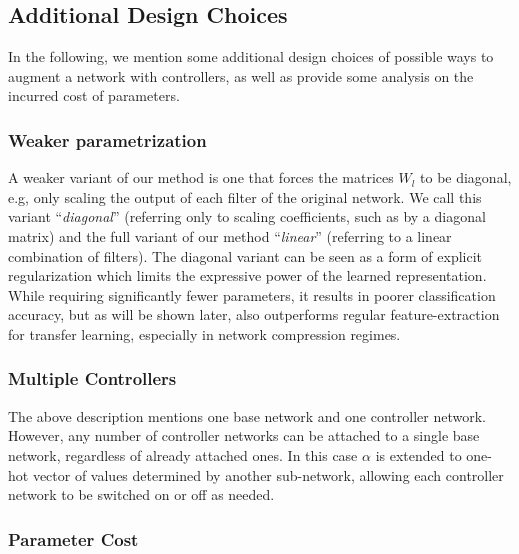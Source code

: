\documentclass[10pt,journal,compsoc]{IEEEtran}
\begin{document}
\subsection{Additional Design Choices}

In the following, we mention some additional design choices of possible
ways to augment a network with controllers, as well as provide some
analysis on the incurred cost of parameters. 

\subsubsection{Weaker parametrization}

A weaker variant of our method is one that forces the matrices $W_{l}$
to be diagonal, e.g, only scaling the output of each filter of the
original network. We call this variant ``\emph{diagonal}'' (referring
only to scaling coefficients, such as by a diagonal matrix) and the
full variant of our method ``\emph{linear}'' (referring to a linear
combination of filters). The diagonal variant can be seen as a form
of explicit regularization which limits the expressive power of the
learned representation. While requiring significantly fewer parameters,
it results in poorer classification accuracy, but as will be shown
later, also outperforms regular feature-extraction for transfer learning,
especially in network compression regimes. 

\subsubsection{Multiple Controllers\label{subsec:Multiple-Controllers} }

The above description mentions one base network and one controller
network. However, any number of controller networks can be attached
to a single base network, regardless of already attached ones. In
this case $\alpha$ is extended to one-hot vector of values determined
by another sub-network, allowing each controller network to be switched
on or off as needed.

\subsubsection{Parameter Cost\label{par:Weight-Efficiency}}
\end{document}
